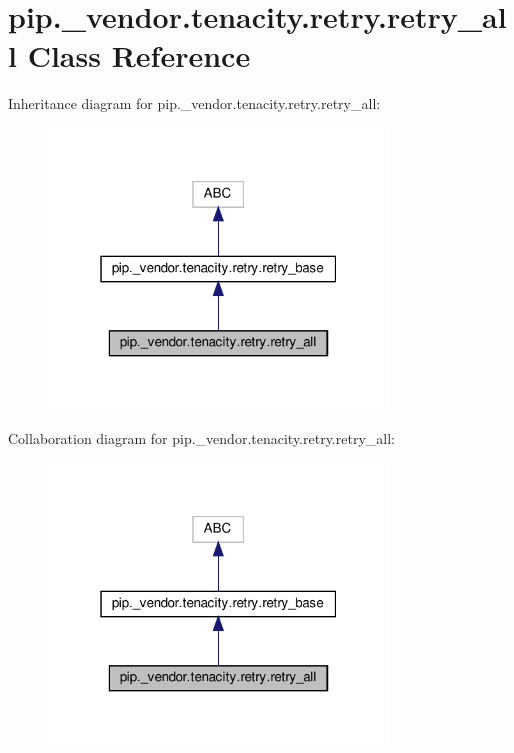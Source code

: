 \hypertarget{classpip_1_1__vendor_1_1tenacity_1_1retry_1_1retry__all}{}\section{pip.\+\_\+vendor.\+tenacity.\+retry.\+retry\+\_\+all Class Reference}
\label{classpip_1_1__vendor_1_1tenacity_1_1retry_1_1retry__all}


Inheritance diagram for pip.\+\_\+vendor.\+tenacity.\+retry.\+retry\+\_\+all\+:
\nopagebreak
\begin{figure}[H]
\begin{center}
\leavevmode
\includegraphics[width=256pt]{classpip_1_1__vendor_1_1tenacity_1_1retry_1_1retry__all__inherit__graph}
\end{center}
\end{figure}


Collaboration diagram for pip.\+\_\+vendor.\+tenacity.\+retry.\+retry\+\_\+all\+:
\nopagebreak
\begin{figure}[H]
\begin{center}
\leavevmode
\includegraphics[width=256pt]{classpip_1_1__vendor_1_1tenacity_1_1retry_1_1retry__all__coll__graph}
\end{center}
\end{figure}
